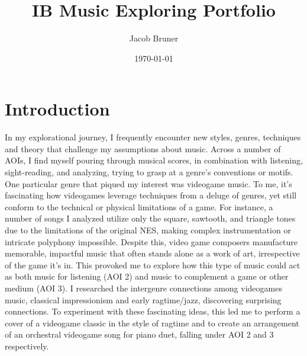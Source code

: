 \documentclass[11pt,a4paper]{article}
\author{Jacob Bruner}
\title{IB Music Exploring Portfolio}
\date{\today}
\begin{document}
\maketitle
\tableofcontents

\pagebreak

\iffalse
heres an example of a code block
\begin{lstlisting}
        def intervalValues(z, n):
            return output $\sharp$ return the sequence of values
\end{lstlisting}

heres an example of an image
\begin{figure}[h]
\begin{center}
\texttt{[image: onefifteen]} 
\caption{Sequences Generated by n = 1-15 on Argand Diagram}
\end{center}
\end{figure}
\fi

\section{Introduction}
In my explorational journey, I frequently encounter new styles, genres, techniques and theory that challenge my assumptions about music. Across a number of AOIs, I find myself pouring through musical scores, in combination with listening, sight-reading, and analyzing, trying to grasp at a genre’s conventions or motifs. One particular genre that piqued my interest was videogame music. To me, it’s fascinating how videogames leverage techniques from a deluge of genres, yet still conform to the technical or physical limitations of a game. For instance, a number of songs I analyzed utilize only the square, sawtooth, and triangle tones due to the limitations of the original NES, making complex instrumentation or intricate polyphony impossible. Despite this, video game composers manufacture memorable, impactful music that often stands alone as a work of art, irrespective of the game it's in. This provoked me to explore how this type of music could act as both music for listening (AOI 2) and music to complement a game or other medium (AOI 3). I researched the intergenre connections among videogames music, classical impressionism and early ragtime/jazz, discovering surprising connections. To experiment with these fascinating ideas, this led me to perform a cover of a videogame classic in the style of ragtime and to create an arrangement of an orchestral videogame song for piano duet, falling under AOI 2 and 3 respectively.
\end{document}
